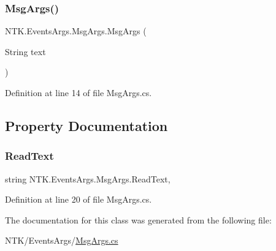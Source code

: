 \subsubsection{\texorpdfstring{MsgArgs()}{MsgArgs()}}
{\footnotesize\ttfamily N\+T\+K.\+Events\+Args.\+Msg\+Args.\+Msg\+Args (\begin{DoxyParamCaption}\item[{String}]{text }\end{DoxyParamCaption})}



Definition at line 14 of file Msg\+Args.\+cs.



\subsection{Property Documentation}
\mbox{\label{class_n_t_k_1_1_events_args_1_1_msg_args_a9d2bfa091ea5be54c00b0ad9264661de}} 
\subsubsection{\texorpdfstring{ReadText}{ReadText}}
{\footnotesize\ttfamily string N\+T\+K.\+Events\+Args.\+Msg\+Args.\+Read\+Text\hspace{0.3cm}{\ttfamily [get]}, {\ttfamily [set]}}



Definition at line 20 of file Msg\+Args.\+cs.



The documentation for this class was generated from the following file\+:\begin{DoxyCompactItemize}
\item 
N\+T\+K/\+Events\+Args/\mbox{\hyperlink{_msg_args_8cs}{Msg\+Args.\+cs}}\end{DoxyCompactItemize}
